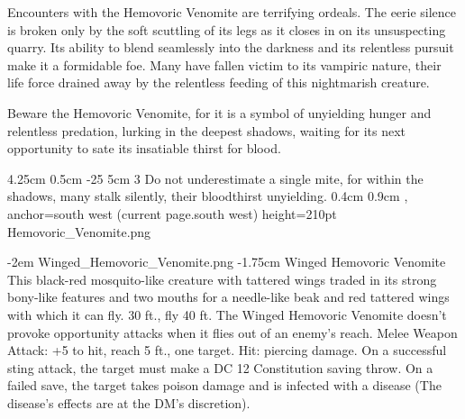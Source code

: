 Encounters with the Hemovoric Venomite are terrifying ordeals. The eerie silence is broken only by the soft scuttling of its legs as it closes in on its unsuspecting quarry. Its ability to blend seamlessly into the darkness and its relentless pursuit make it a formidable foe. Many have fallen victim to its vampiric nature, their life force drained away by the relentless feeding of this nightmarish creature.

Beware the Hemovoric Venomite, for it is a symbol of unyielding hunger and relentless predation, lurking in the deepest shadows, waiting for its next opportunity to sate its insatiable thirst for blood.

{%
	{4.25cm}%
	{0.5cm}%
	{-25}%
	{5cm}%
	{3}%
	{%
		Do not underestimate a single mite, for within the shadows, many stalk silently, their bloodthirst unyielding. %
	}%
}%
{0.4cm}%
{0.9cm}%
{, anchor=south west}%
{(current page.south west)}%
{height=210pt}%
{Hemovoric_Venomite.png}%
%

\vfill\eject %

\MonsterVariant%
	{-2em}%
	{Winged_Hemovoric_Venomite.png}%
	{-1.75cm} %
	{Winged Hemovoric Venomite}%
	{%
		This black-red mosquito-like creature with tattered wings traded in its strong bony-like features and two mouths for a needle-like beak and red tattered wings with which it can fly.
		30 ft., fly 40 ft.
		The Winged Hemovoric Venomite doesn't provoke opportunity attacks when it flies out of an enemy's reach.
		Melee Weapon Attack: +5 to hit, reach 5 ft., one target. Hit:  piercing damage. On a successful sting attack, the target must make a DC 12 Constitution saving throw. On a failed save, the target takes  poison damage and is infected with a disease (The disease's effects are at the DM's discretion).
	}%
%

